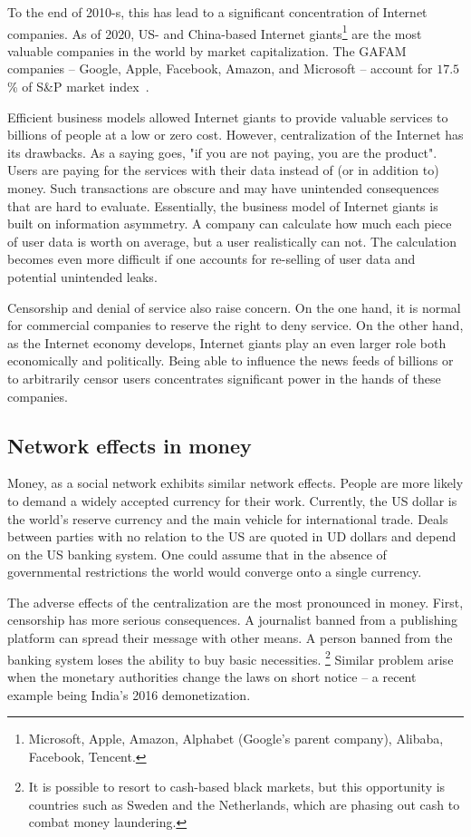 To the end of 2010-s, this has lead to a significant concentration of Internet companies.
As of 2020, US- and China-based Internet giants\footnote{Microsoft, Apple, Amazon, Alphabet (Google's parent company), Alibaba, Facebook, Tencent.} are the most valuable companies in the world by market capitalization.
The GAFAM companies -- Google, Apple, Facebook, Amazon, and Microsoft -- account for $17.5$\% of S\&P market index~\cite{Levy2020}.

Efficient business models allowed Internet giants to provide valuable services to billions of people at a low or zero cost.
However, centralization of the Internet has its drawbacks.
As a saying goes, "if you are not paying, you are the product".
Users are paying for the services with their data instead of (or in addition to) money.
Such transactions are obscure and may have unintended consequences that are hard to evaluate.
Essentially, the business model of Internet giants is built on information asymmetry.
A company can calculate how much each piece of user data is worth on average, but a user realistically can not.
The calculation becomes even more difficult if one accounts for re-selling of user data and potential unintended leaks. 

Censorship and denial of service also raise concern.
On the one hand, it is normal for commercial companies to reserve the right to deny service.
On the other hand, as the Internet economy develops, Internet giants play an even larger role both economically and politically.
Being able to influence the news feeds of billions or to arbitrarily censor users concentrates significant power in the hands of these companies.


\subsection{Network effects in money}

Money, as a social network exhibits similar network effects.
People are more likely to demand a widely accepted currency for their work.
Currently, the US dollar is the world's reserve currency and the main vehicle for international trade.
Deals between parties with no relation to the US are quoted in UD dollars and depend on the US banking system.
One could assume that in the absence of governmental restrictions the world would converge onto a single currency.

The adverse effects of the centralization are the most pronounced in money.
First, censorship has more serious consequences.
A journalist banned from a publishing platform can spread their message with other means.
A person banned from the banking system loses the ability to buy basic necessities.
\footnote{It is possible to resort to cash-based black markets, but this opportunity is countries such as Sweden and the Netherlands, which are phasing out cash to combat money laundering.}
Similar problem arise when the monetary authorities change the laws on short notice -- a recent example being India's 2016 demonetization.

